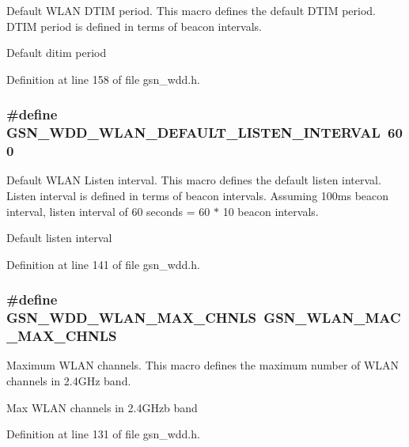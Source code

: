 Default WLAN DTIM period. This macro defines the default DTIM period. DTIM period is defined in terms of beacon intervals. 

Default ditim period 

Definition at line 158 of file gsn\_\-wdd.h.

\hypertarget{a00677_ga1cd4e2c2ef057685d974d4a865e5f934}{
\subsubsection[{GSN\_\-WDD\_\-WLAN\_\-DEFAULT\_\-LISTEN\_\-INTERVAL}]{\setlength{\rightskip}{0pt plus 5cm}\#define GSN\_\-WDD\_\-WLAN\_\-DEFAULT\_\-LISTEN\_\-INTERVAL~600}}
\label{a00677_ga1cd4e2c2ef057685d974d4a865e5f934}


Default WLAN Listen interval. This macro defines the default listen interval. Listen interval is defined in terms of beacon intervals. Assuming 100ms beacon interval, listen interval of 60 seconds = 60 $\ast$ 10 beacon intervals. 

Default listen interval 

Definition at line 141 of file gsn\_\-wdd.h.

\hypertarget{a00677_ga3d65e35c6d96f765b7e4c83373d90c57}{
\subsubsection[{GSN\_\-WDD\_\-WLAN\_\-MAX\_\-CHNLS}]{\setlength{\rightskip}{0pt plus 5cm}\#define GSN\_\-WDD\_\-WLAN\_\-MAX\_\-CHNLS~GSN\_\-WLAN\_\-MAC\_\-MAX\_\-CHNLS}}
\label{a00677_ga3d65e35c6d96f765b7e4c83373d90c57}


Maximum WLAN channels. This macro defines the maximum number of WLAN channels in 2.4GHz band. 

Max WLAN channels in 2.4GHzb band 

Definition at line 131 of file gsn\_\-wdd.h.

